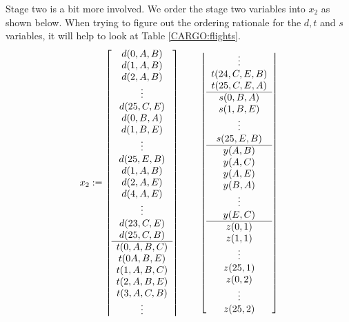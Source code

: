 Stage two is a bit more involved.  We order the stage two variables into $x_2$ as shown below.  When trying to figure out the ordering rationale for the $d,t$ and $s$ variables, it will help to look at Table \ref{CARGO:flights}.
\[
x_2\assign\left\lceil\ajfbox{
d(0,A,B)\\
d(1,A,B)\\
d(2,A,B)\\
\vdots\\
d(25,C,E)\\
d(0,B,A)\\
d(1,B,E)\\
\vdots\\
d(25,E,B)\\
d(1,A,B)\\
d(2,A,E)\\
d(4,A,E)\\
\vdots\\
d(23,C,E)\\
d(25,C,B)\\ \hline
t(0,A,B,C)\\
t(0A,B,E)\\
t(1,A,B,C)\\
t(2,A,B,E)\\
t(3,A,C,B)\\
\vdots}\right\rceil \qquad%
\left\lfloor\ajfbox{
\vdots\\
t(24,C,E,B)\\
t(25,C,E,A)\\ \hline
s(0,B,A)\\
s(1,B,E)\\
\vdots\\
s(25,E,B)\\ \hline
y(A,B)\\
y(A,C)\\
y(A,E)\\
y(B,A)\\
\vdots\\
y(E,C)\\ \hline
z(0,1)\\
z(1,1)\\
\vdots\\
z(25,1)\\
z(0,2)\\
\vdots\\
z(25,2)}\right\rfloor
\]

